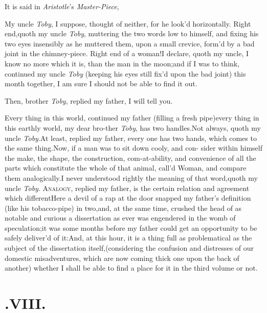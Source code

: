 \documentclass{article}
\begin{document}
It is said in \textit{Aristotle}’s \textit{Master-Piece},

My uncle \textit{Toby}, I suppose, thought of neither, for he
look’d horizontally.\tsk\break
Right end,\tsk quoth my uncle \textit{Toby}, muttering the two words low to himself, and fixing his
two eyes insensibly as he muttered them, upon a small crevice,
form’d by a bad joint in the chimney-piece.\tsk\break
Right end of a woman!\tsh I declare,
quoth my uncle, I know no more which it is, than the man in the
moon;\tsk and if I was to think, continued my uncle
\textit{Toby} (keeping his eyes still fix’d upon the bad joint)
this month together, I am sure I should not be able to find it
out.

Then, brother \textit{Toby}, replied my father, I will tell you.

Every thing in this world, continued my father (filling a fresh
pipe)\tsk every thing in this earthly world, my dear
bro-\break ther \textit{Toby},
has two handles.\tsk Not always, quoth my uncle
\textit{Toby}.\tsh At least, replied my father, every one
has two hands,\tsk\break
which comes to the same
thing.\tsh Now, if a man was to sit down cooly, and con-\break
sider within himself the make, the shape, the construction,
com-at-ability, and convenience of all the parts which
constitute
the whole of that animal, call’d Woman, and compare them
analogically.\tsk I never understood rightly the meaning of that
word,\tsk quoth my uncle \textit{Toby}.\tsh\break
\textsc{Analogy}, replied my father, is the certain
relation and agreement which different\tsh Here a devil of
a rap at the door snapped my father’s definition (like his
tobacco-pipe) in two,\tsk and, at the same time, crushed the head
of as notable and curious a dissertation as ever was
engendered in the womb of speculation;\tsk it was some months
before my father could get an opportunity to be safely
deliver’d of
it:\tsk And, at this hour, it is a thing full as problematical as
the subject of the dissertation itself,\tsk (considering the
confusion and distresses of our domestic misadventures, which are
now coming thick one upon the back of another) whether I shall be
able to find a place for it in the third volume or not.

\section{.\enspace  VIII.}
\end{document}
